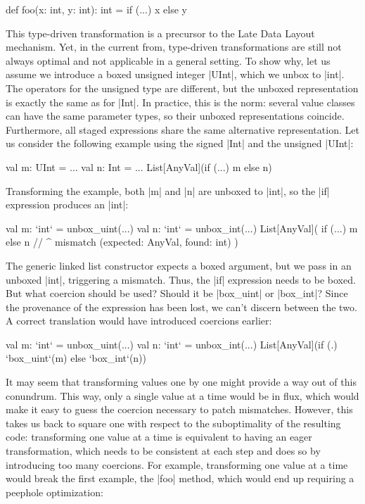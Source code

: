 \begin{lstlisting-nobreak}
 def foo(x: int, y: int): int =
   if (...) x else y
\end{lstlisting-nobreak}

This type-driven transformation is  a precursor to the Late Data Layout mechanism. Yet, in the current from, type-driven transformations are still not always optimal and not applicable in a general setting. To show why, let us assume we introduce a boxed unsigned integer |UInt|, which we unbox to |int|. The operators for the unsigned type are different, but the unboxed representation is exactly the same as for |Int|. In practice, this is the norm: several value classes can have the same parameter types, so their unboxed representations coincide. Furthermore, all staged expressions share the same alternative representation. Let us consider the following example using the signed |Int| and the unsigned |UInt|:

\begin{lstlisting-nobreak}
 val m: UInt = ...
 val n: Int = ...
 List[AnyVal](if (...) m else n)
\end{lstlisting-nobreak}

Transforming the example, both |m| and |n| are unboxed to |int|, so the |if| expression produces an |int|:

\begin{lstlisting-nobreak}
 val m: `int` = unbox_uint(...)
 val n: `int` = unbox_int(...)
 List[AnyVal](
   if (...) m else n
   // ^ mismatch (expected: AnyVal, found: int)
 )
\end{lstlisting-nobreak}

The generic linked list constructor expects a boxed argument, but we pass in an unboxed |int|, triggering a mismatch. Thus, the |if| expression needs to be boxed. But what coercion should be used? Should it be |box_uint| or |box_int|? Since the provenance of the expression has been lost, we can't discern between the two. A correct translation would have introduced coercions earlier:

\begin{lstlisting-nobreak}
 val m: `int` = unbox_uint(...)
 val n: `int` = unbox_int(...)
 List[AnyVal](if (.) `box_uint`(m) else `box_int`(n))
\end{lstlisting-nobreak}

It may seem that transforming values one by one might provide a way out of this conundrum. This way, only a single value at a time would be in flux, which would make it easy to guess the coercion necessary to patch mismatches. However, this takes us back to square one with respect to the suboptimality of the resulting code: transforming one value at a time is equivalent to having an eager transformation, which needs to be consistent at each step and does so by introducing too many coercions. For example, transforming one value at a time would break the first example, the |foo| method, which would end up requiring a peephole optimization:

